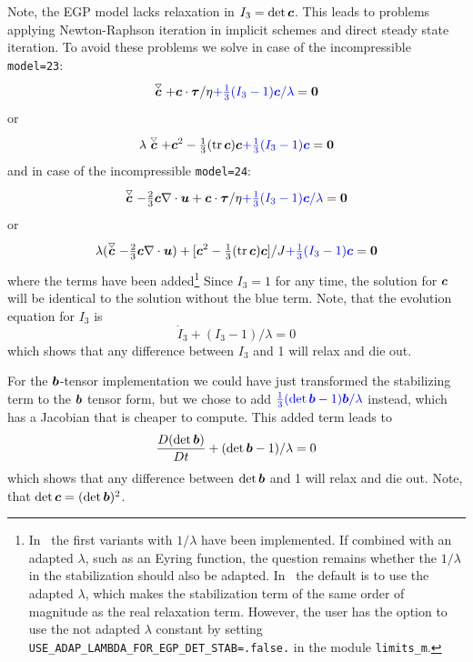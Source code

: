 Note, the EGP model lacks relaxation in $I_3=\det\boldsymbol{c}$. This leads to problems applying Newton-Raphson iteration in implicit schemes and direct steady state iteration. To avoid these problems we solve in case of the incompressible \texttt{model=23}:
\begin{equation}
  \stackrel{\scriptscriptstyle\bigtriangledown}{\boldsymbol{c}} + \boldsymbol{c}\cdot\boldsymbol{\tau}/\eta  \textcolor{blue}{+\tfrac{1}{3}(I_3-1)\boldsymbol{c}/\lambda}=\boldsymbol{0}
\end{equation}
or
\begin{equation}
  \lambda\stackrel{\scriptscriptstyle\bigtriangledown}{\boldsymbol{c}} + \boldsymbol{c}^2 -\tfrac13(\operatorname{tr}\boldsymbol{c})\boldsymbol{c} \textcolor{blue}{+\tfrac{1}{3}(I_3-1)\boldsymbol{c}}=\boldsymbol{0}
\end{equation}
and in case of the incompressible \texttt{model=24}:
\begin{equation}
  \stackrel{\scriptscriptstyle\bigtriangledown}{\boldsymbol{c}} -\tfrac23\boldsymbol{c}\nabla\cdot\boldsymbol{u}+ \boldsymbol{c}\cdot\boldsymbol{\tau}/\eta \textcolor{blue}{+ \tfrac{1}{3}(I_3-1)\boldsymbol{c}/\lambda}=\boldsymbol{0}
\end{equation}
or 
\begin{equation}
  \lambda(\stackrel{\scriptscriptstyle\bigtriangledown}{\boldsymbol{c}} -\tfrac23\boldsymbol{c}\nabla\cdot\boldsymbol{u})+ [\boldsymbol{c}^2 -\tfrac13(\operatorname{tr}\boldsymbol{c})\boldsymbol{c}]/J\textcolor{blue}{+\tfrac{1}{3}(I_3-1)\boldsymbol{c}}=\boldsymbol{0}
\end{equation}
where the  terms have been added\footnote{In \tfem\ the first variants with $1/\lambda$ have been implemented. If combined with an adapted $\lambda$, such as an Eyring function, the question remains whether  the $1/\lambda$ in the stabilization should also be adapted. In \tfem\ the default is to use the adapted $\lambda$, which makes the stabilization term of the same order of magnitude as the real relaxation term. However, the user has the option to use the not adapted $\lambda$ constant by setting \texttt{USE\_ADAP\_LAMBDA\_FOR\_EGP\_DET\_STAB=.false.} in the
module \texttt{limits\_m}.}
Since $I_3=1$ for any time, the solution for $\boldsymbol{c}$ will be identical to the solution without the blue term. Note, that the evolution equation for $I_3$ is 
\[
   \dot I_3+(I_3-1)/\lambda=0
\]
which shows that any difference between $I_3$ and 1 will relax and die out.

For the $\boldsymbol{b}$-tensor implementation we could have just transformed the stabilizing term to the $\boldsymbol{b}$ tensor form, but we chose to add $\textcolor{blue}{\tfrac13(\det\boldsymbol{b}-1)\boldsymbol{b}/\lambda}$ instead, which has a Jacobian that is cheaper to compute. 
This added term leads to
\[
   \dfrac{D (\det\boldsymbol{b})}{D t}+(\det\boldsymbol{b}-1)/\lambda=0
\]
which shows that any difference between $\det\boldsymbol{b}$ and 1 will relax and die out. Note, that $\det\boldsymbol{c}=(\det\boldsymbol{b})^2$.


